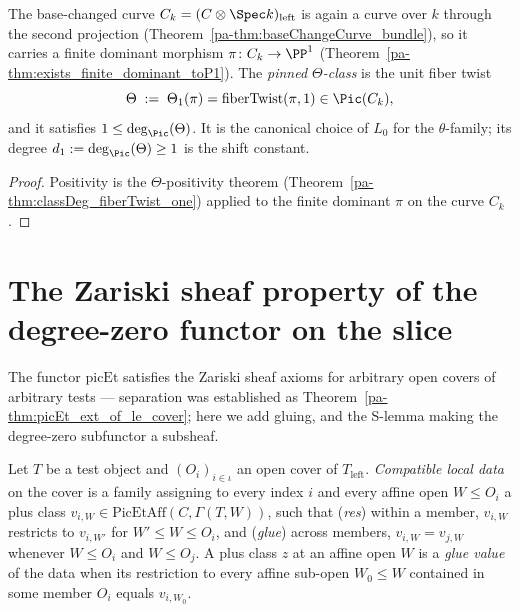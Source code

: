 \begin{definition}
  \label{pa-def:thetaCechClass}
  \leanok

  The base-changed curve \(C_k = (C \otimes \Spec k)_{\mathrm{left}}\) is again a curve over
  \(k\) through the second projection (Theorem~\ref{pa-thm:baseChangeCurve_bundle}), so it
  carries a finite dominant morphism \(\pi \colon C_k \to \PP^1\)
  (Theorem~\ref{pa-thm:exists_finite_dominant_toP1}). The \emph{pinned \(\Theta\)-class} is the
  unit fiber twist
  \[
    \Theta \;:=\; \Theta_1(\pi) = \mathrm{fiberTwist}(\pi, 1) \in \Pic(C_k),
  \]
  and it satisfies \(1 \le \deg_{\Pic}(\Theta)\). It is the canonical choice of \(L_0\) for
  the \(\theta\)-family; its degree \(d_1 := \deg_{\Pic}(\Theta) \ge 1\) is the shift
  constant.
\end{definition}
\begin{proof}
  \leanok
  Positivity is the \(\Theta\)-positivity theorem
  (Theorem~\ref{pa-thm:classDeg_fiberTwist_one}) applied to the finite dominant \(\pi\) on the
  curve \(C_k\).
\end{proof}

\section{The Zariski sheaf property of the degree-zero functor on the slice}
\label{pa-sec:pic0ZariskiSheaf}

The functor \(\mathrm{picEt}\) satisfies the Zariski sheaf axioms for arbitrary open covers
of arbitrary tests — separation was established as Theorem~\ref{pa-thm:picEt_ext_of_le_cover};
here we add gluing, and the S-lemma making the degree-zero subfunctor a subsheaf.

\begin{definition}
  \label{pa-def:picEt_LocalData}
  \leanok

  Let \(T\) be a test object and \((O_i)_{i \in \iota}\) an open cover of
  \(T_{\mathrm{left}}\). \emph{Compatible local data} on the cover is a family assigning to
  every index \(i\) and every affine open \(W \le O_i\) a plus class
  \(v_{i,W} \in \mathrm{PicEtAff}(C, \Gamma(T,W))\), such that
  (\emph{res}) within a member, \(v_{i,W}\) restricts to \(v_{i,W'}\) for \(W' \le W \le O_i\),
  and (\emph{glue}) across members, \(v_{i,W} = v_{j,W}\) whenever \(W \le O_i\) and
  \(W \le O_j\). A plus class \(z\) at an affine open \(W\) is a \emph{glue value} of the
  data when its restriction to every affine sub-open \(W_0 \le W\) contained in some member
  \(O_i\) equals \(v_{i,W_0}\).
\end{definition}

